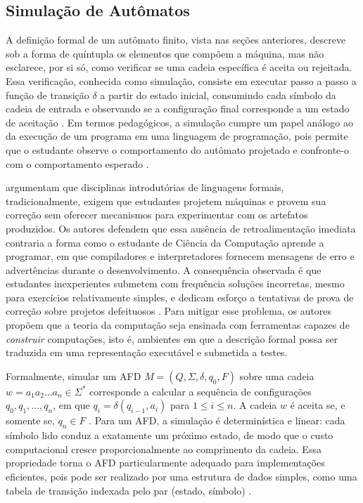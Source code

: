 \documentclass[
    12pt
    ,oneside
    ,a4paper
    ,chapter=TITLE
    ,section=TITLE
    ,sumario=abnt-6027-2012]{abntex2}
\begin{document}
\subsection{Simulação de Autômatos}
\label{sec:simulacao_automatos}

A definição formal de um autômato finito, vista nas seções anteriores, descreve sob a forma de
quíntupla os elementos que compõem a máquina, mas não esclarece, por si só, como verificar se
uma cadeia específica é aceita ou rejeitada. Essa verificação, conhecida como
simulação, consiste em executar passo a passo a função de transição $\delta$ a partir
do estado inicial, consumindo cada símbolo da cadeia de entrada e observando se a configuração
final corresponde a um estado de aceitação \cite{hopcroft2006,sipser2012}. Em termos
pedagógicos, a simulação cumpre um papel análogo ao da execução de um programa em uma linguagem
de programação, pois permite que o estudante observe o comportamento do autômato projetado e
confronte-o com o comportamento esperado \cite{morazan2014}.

 argumentam que disciplinas introdutórias de linguagens formais,
tradicionalmente, exigem que estudantes projetem máquinas e provem sua correção sem oferecer
mecanismos para experimentar com os artefatos produzidos. Os autores defendem que essa ausência
de retroalimentação imediata contraria a forma como o estudante de Ciência da Computação aprende
a programar, em que compiladores e interpretadores fornecem mensagens de erro e advertências
durante o desenvolvimento. A consequência observada é que estudantes inexperientes submetem com
frequência soluções incorretas, mesmo para exercícios relativamente simples, e dedicam esforço
a tentativas de prova de correção sobre projetos defeituosos \cite{morazan2014}. Para mitigar
esse problema, os autores propõem que a teoria da computação seja ensinada com ferramentas
capazes de \textit{construir} computações, isto é, ambientes em que a descrição formal possa
ser traduzida em uma representação executável e submetida a testes.

Formalmente, simular um AFD $M = (Q, \Sigma, \delta, q_0, F)$ sobre uma cadeia $w = a_1 a_2
\dots a_n \in \Sigma^*$ corresponde a calcular a sequência de configurações $q_0, q_1, \dots,
q_n$, em que $q_i = \delta(q_{i-1}, a_i)$ para $1 \leq i \leq n$. A cadeia $w$ é aceita se, e
somente se, $q_n \in F$ \cite{hopcroft2006}. Para um AFD, a simulação é determinística e
linear: cada símbolo lido conduz a exatamente um próximo estado, de modo que o custo
computacional cresce proporcionalmente ao comprimento da cadeia. Essa propriedade torna o AFD
particularmente adequado para implementações eficientes, pois pode ser realizado por uma
estrutura de dados simples, como uma tabela de transição indexada pelo par (estado, símbolo)
\cite{sipser2012}.
\end{document}
